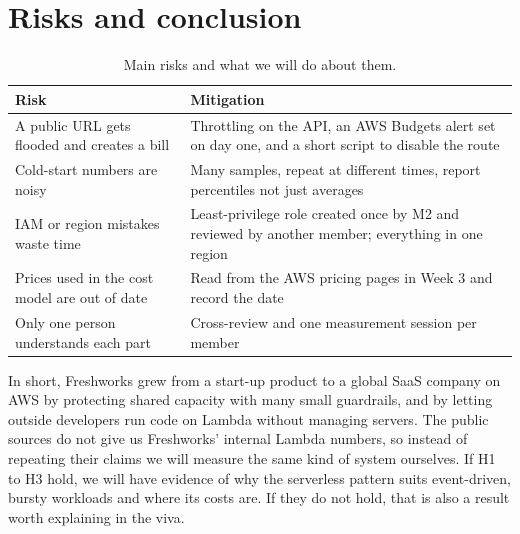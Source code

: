 \documentclass[10pt,a4paper]{article}
\begin{document}
\section{Risks and conclusion}

\begin{table}[ht]
\centering\small
\caption{Main risks and what we will do about them.}\label{tab:risks}
\begin{tabularx}{\textwidth}{@{}Y Y@{}}
\toprule
Risk & Mitigation \\
\midrule
A public URL gets flooded and creates a bill & Throttling on the API, an AWS Budgets alert set on day one, and a short script to disable the route \\
Cold-start numbers are noisy & Many samples, repeat at different times, report percentiles not just averages \\
IAM or region mistakes waste time & Least-privilege role created once by M2 and reviewed by another member; everything in one region \\
Prices used in the cost model are out of date & Read from the AWS pricing pages in Week 3 and record the date \\
Only one person understands each part & Cross-review and one measurement session per member \\
\bottomrule
\end{tabularx}
\end{table}

In short, Freshworks grew from a start-up product to a global SaaS company on AWS by protecting shared capacity with many small guardrails, and by letting outside developers run code on Lambda without managing servers. The public sources do not give us Freshworks' internal Lambda numbers, so instead of repeating their claims we will measure the same kind of system ourselves. If H1 to H3 hold, we will have evidence of why the serverless pattern suits event-driven, bursty workloads and where its costs are. If they do not hold, that is also a result worth explaining in the viva.
\end{document}

